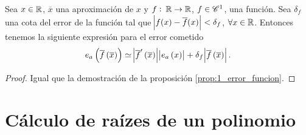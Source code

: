 \begin{prop}
  Sea $x \in \mathbb{R}$, $\overline{x}$ una aproximación de $x$ y $f:\: \mathbb{R} \to \mathbb{R}$, $f\in \mathscr{C}^1$, una función. Sea $\delta_f$ una cota del error de la función tal que $\abs{f(x)-\overline{f}(x)}<\delta_f$, $\forall x \in \mathbb{R}$. Entonces tenemos la siguiente expresión para el error cometido
  \[
      e_a\left( \overline{f}\left( \overline{x}\right) \right)  \simeq \abs{\overline{f}'\left( \overline{x}\right) }\abs{e_a\left( x\right)} + \delta_f\abs{\overline{f}\left( \overline{x}\right)}.
  \]
\end{prop}
\begin{proof}
  Igual que la demostración de la proposición \ref{prop:1_error_funcion}.
\end{proof}

\section{Cálculo de raízes de un polinomio}

